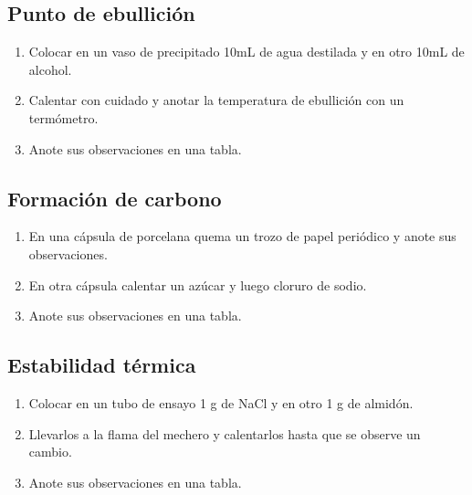 \subsection{Punto de ebullición} 

\begin{enumerate}
    \item Colocar en un vaso de precipitado 10mL de agua destilada y en otro 10mL de alcohol.
    \item Calentar con cuidado y anotar la temperatura de ebullición con un termómetro.
    \item Anote sus observaciones en una tabla.
\end{enumerate}

\subsection{Formación de carbono}

\begin{enumerate}
    \item En una cápsula de porcelana quema un trozo de papel periódico y anote sus observaciones.
    \item En otra cápsula calentar un azúcar y luego cloruro de sodio.
    \item Anote sus observaciones en una tabla.
\end{enumerate}

\subsection{Estabilidad térmica}

\begin{enumerate}
    \item Colocar en un tubo de ensayo 1 g de NaCl y en otro 1 g de almidón.
    \item Llevarlos a la flama del mechero y calentarlos hasta que se observe un cambio.
    \item Anote sus observaciones en una tabla.
\end{enumerate}

